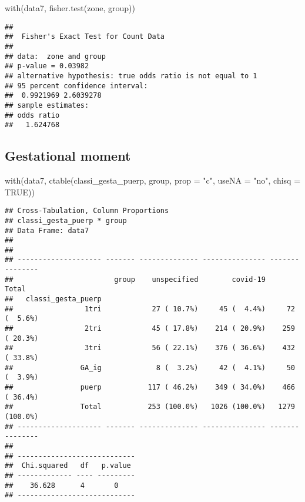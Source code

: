 \documentclass[
]{article}
\newenvironment{Shaded}{\begin{snugshade}}{\end{snugshade}}
\newcommand{\AttributeTok}[1]{\textcolor[rgb]{0.77,0.63,0.00}{#1}}
\newcommand{\ConstantTok}[1]{\textcolor[rgb]{0.00,0.00,0.00}{#1}}
\newcommand{\FunctionTok}[1]{\textcolor[rgb]{0.00,0.00,0.00}{#1}}
\newcommand{\NormalTok}[1]{#1}
\newcommand{\StringTok}[1]{\textcolor[rgb]{0.31,0.60,0.02}{#1}}
\begin{document}
\begin{Shaded}
\begin{Highlighting}[]
\FunctionTok{with}\NormalTok{(data7, }\FunctionTok{fisher.test}\NormalTok{(zone, group))}
\end{Highlighting}
\end{Shaded}

\begin{verbatim}
## 
##  Fisher's Exact Test for Count Data
## 
## data:  zone and group
## p-value = 0.03982
## alternative hypothesis: true odds ratio is not equal to 1
## 95 percent confidence interval:
##  0.9921969 2.6039278
## sample estimates:
## odds ratio 
##   1.624768
\end{verbatim}

\hypertarget{gestational-moment}{%
\subsection{Gestational moment}\label{gestational-moment}}

\begin{Shaded}
\begin{Highlighting}[]
\FunctionTok{with}\NormalTok{(data7, }\FunctionTok{ctable}\NormalTok{(classi\_gesta\_puerp, group, }\AttributeTok{prop =} \StringTok{"c"}\NormalTok{, }\AttributeTok{useNA =} \StringTok{"no"}\NormalTok{, }\AttributeTok{chisq =} \ConstantTok{TRUE}\NormalTok{))}
\end{Highlighting}
\end{Shaded}

\begin{verbatim}
## Cross-Tabulation, Column Proportions  
## classi_gesta_puerp * group  
## Data Frame: data7  
## 
## 
## -------------------- ------- -------------- --------------- ---------------
##                        group    unspecified        covid-19           Total
##   classi_gesta_puerp                                                       
##                 1tri            27 ( 10.7%)     45 (  4.4%)     72 (  5.6%)
##                 2tri            45 ( 17.8%)    214 ( 20.9%)    259 ( 20.3%)
##                 3tri            56 ( 22.1%)    376 ( 36.6%)    432 ( 33.8%)
##                GA_ig             8 (  3.2%)     42 (  4.1%)     50 (  3.9%)
##                puerp           117 ( 46.2%)    349 ( 34.0%)    466 ( 36.4%)
##                Total           253 (100.0%)   1026 (100.0%)   1279 (100.0%)
## -------------------- ------- -------------- --------------- ---------------
## 
## ----------------------------
##  Chi.squared   df   p.value 
## ------------- ---- ---------
##    36.628      4       0    
## ----------------------------
\end{verbatim}
\end{document}
